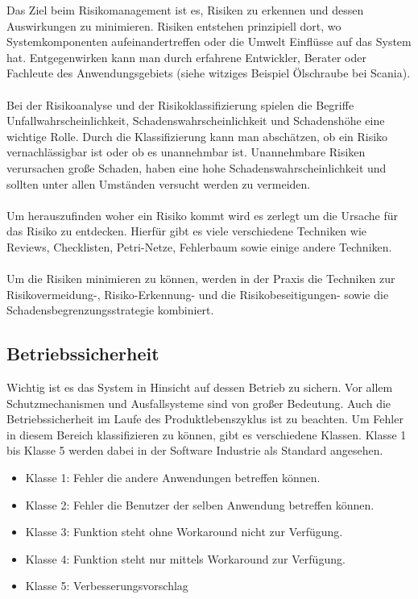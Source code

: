 Das Ziel beim Risikomanagement ist es, Risiken zu erkennen und dessen Auswirkungen zu minimieren. Risiken entstehen prinzipiell dort, wo Systemkomponenten aufeinandertreffen oder die Umwelt Einflüsse auf das System hat. Entgegenwirken kann man durch erfahrene Entwickler, Berater oder Fachleute des Anwendungsgebiets (siehe witziges Beispiel Ölschraube bei Scania).
\\\\
Bei der Risikoanalyse und der Risikoklassifizierung spielen die Begriffe Unfallwahrscheinlichkeit, Schadenswahrscheinlichkeit und Schadenshöhe eine wichtige Rolle. Durch die Klassifizierung kann man  abschätzen, ob ein Risiko vernachlässigbar ist oder ob es unannehmbar ist. Unannehmbare Risiken verursachen große Schaden, haben eine hohe Schadenswahrscheinlichkeit und sollten unter allen Umständen versucht werden zu vermeiden.
\\\\
Um herauszufinden woher ein Risiko kommt wird es zerlegt um die Ursache für das Risiko zu entdecken. Hierfür gibt es viele verschiedene Techniken wie Reviews, Checklisten, Petri-Netze, Fehlerbaum sowie einige andere Techniken.
\\\\
Um die Risiken minimieren zu können, werden in der Praxis die Techniken zur Risikovermeidung-, Risiko-Erkennung- und die Risikobeseitigungen- sowie die Schadensbegrenzungsstrategie kombiniert.

\subsection{Betriebssicherheit}
Wichtig ist es das System in Hinsicht auf dessen Betrieb zu sichern. Vor allem Schutzmechanismen und Ausfallsysteme sind von großer Bedeutung. Auch die Betriebssicherheit im Laufe des Produktlebenszyklus ist zu beachten. Um Fehler in diesem Bereich klassifizieren zu können, gibt es verschiedene Klassen. Klasse 1 bis Klasse 5 werden dabei in der Software Industrie als Standard angesehen.

\begin{itemize}
\item Klasse 1: Fehler die andere Anwendungen betreffen können.
\item Klasse 2: Fehler die Benutzer der selben Anwendung betreffen können.
\item Klasse 3: Funktion steht ohne Workaround nicht zur Verfügung.
\item Klasse 4: Funktion steht nur mittels Workaround zur Verfügung.
\item Klasse 5: Verbesserungsvorschlag 
\end{itemize}

